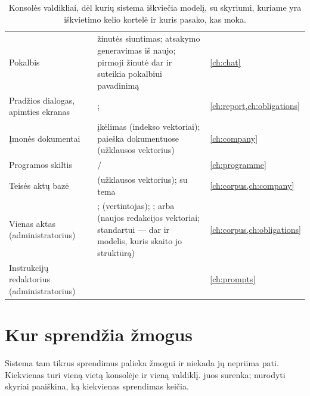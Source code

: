 \begin{table}[H]
\caption{Konsolės valdikliai, dėl kurių sistema iškviečia modelį, su skyriumi, kuriame yra
iškvietimo kelio kortelė ir kuris pasako, kas moka.}\label{tab:console:modelbuttons}
\begin{tabularx}{\textwidth}{@{}L{40mm}YL{28mm}@{}}
\toprule
{} &  &  \\
\midrule
Pokalbis & žinutės siuntimas; atsakymo generavimas iš naujo; pirmoji žinutė dar ir suteikia
pokalbiui pavadinimą & \cref{ch:chat} \\
Pradžios dialogas, apimties ekranas & ;  &
\cref{ch:report,ch:obligations} \\
Įmonės dokumentai & įkėlimas (indekso vektoriai); paieška dokumentuose (užklausos
vektorius) & \cref{ch:company} \\
Programos skiltis &  /  & \cref{ch:programme} \\
Teisės aktų bazė &  (užklausos vektorius);  su tema &
\cref{ch:corpus,ch:company} \\
Vienas aktas (administratorius) & ; 
(vertintojas); ;  arba  (naujos redakcijos vektoriai; standartui --- dar ir modelis, kuris skaito jo
struktūrą) & \cref{ch:corpus,ch:obligations} \\
Instrukcijų redaktorius (administratorius) &  & \cref{ch:prompts} \\
\bottomrule
\end{tabularx}
\end{table}

\section{Kur sprendžia žmogus}\label{sec:console:decisions}

Sistema tam tikrus sprendimus palieka žmogui ir niekada jų nepriima pati. Kiekvienas turi vieną
vietą konsolėje ir vieną valdiklį.  juos surenka; nurodyti skyriai
paaiškina, ką kiekvienas sprendimas keičia.

